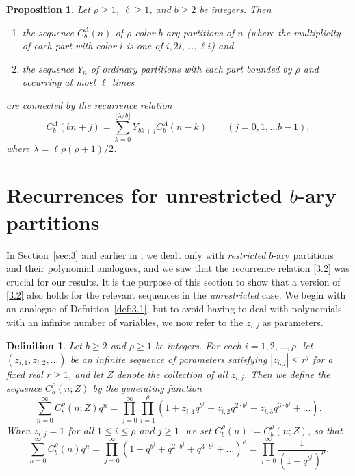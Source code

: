 \documentclass{amsart}
\theoremstyle{plain}
\newtheorem{definition}[theorem]{Definition}
\newtheorem{proposition}[theorem]{Proposition}
\numberwithin{equation}{section}
\begin{document}
\begin{proposition}\label{prop:3.13}
Let $\rho\geq 1$, $\ell\geq 1$, and $b\geq 2$ be integers. Then
\begin{enumerate}
\item[(a)] the sequence $C_b^{\Lambda}(n)$ of $\rho$-color $b$-ary 
partitions of $n$ (where the multiplicity of each part with color $i$ is one 
of $i, 2i, \ldots, \ell i$) and
\item[(b)] the sequence $Y_n$ of ordinary partitions with each part bounded by
$\rho$ and occurring at most $\ell$ times
\end{enumerate}
are connected by the recurrence relation
\begin{equation}\label{3.19}
C_b^\Lambda(bn+j)=\sum_{k=0}^{\lfloor\lambda/b\rfloor}Y_{bk+j}C_b^\Lambda(n-k)
\qquad (j=0, 1,\ldots b-1),
\end{equation}
where $\lambda=\ell\rho(\rho+1)/2$.
\end{proposition}

\section{Recurrences for unrestricted $b$-ary partitions}\label{sec:5}

In Section~\ref{sec:3} and earlier in \cite{DE10}, we dealt only with 
{\it restricted\/} $b$-ary partitions and their polynomial analogues, and we 
saw that the recurrence relation \eqref{3.2} was crucial for our results. It is
the purpose of this section to show that a version of \eqref{3.2} also holds 
for the relevant sequences in the {\it unrestricted\/} case. We begin with an 
analogue of 
Defnition~\ref{def:3.1}, but to avoid having to deal with polynomials with
an infinite number of variables, we now refer to the $z_{i,j}$ as parameters.

\begin{definition}\label{def:5.1}
Let $b\geq 2$ and $\rho\geq 1$ be integers. For each $i=1, 2, \ldots, \rho$, 
let $(z_{i,1}, z_{i,2}, \ldots)$ be an infinite sequence of parameters 
satisfying $|z_{i,j}|\leq r^j$ for a fixed real $r\geq 1$, and let $Z$ denote 
the collection of all $z_{i,j}$. Then we define the sequence
$C_b^\rho(n;Z)$ by the generating function
\begin{equation}\label{5.1}
\sum_{n=0}^\infty C_b^\rho(n;Z)q^n =\prod_{j=0}^\infty\prod_{i=1}^\rho
\left(1+z_{i,1}q^{b^j}+z_{i,2}q^{2\cdot b^j}+z_{i,3}q^{3\cdot b^j}+\dots\right).
\end{equation}
When $z_{i,j}=1$ for all $1\leq i\leq\rho$ and $j\geq 1$, we set
$C_b^\rho(n):=C_b^\rho(n;Z)$, so that
\begin{equation}\label{5.2}
\sum_{n=0}^\infty C_b^\rho(n)q^n =\prod_{j=0}^\infty
\left(1+q^{b^j}+q^{2\cdot b^j}+q^{3\cdot b^j}+\dots\right)^\rho
=\prod_{j=0}^\infty\frac{1}{\left(1-q^{b^j}\right)^\rho}.
\end{equation}
\end{definition}
\end{document}

